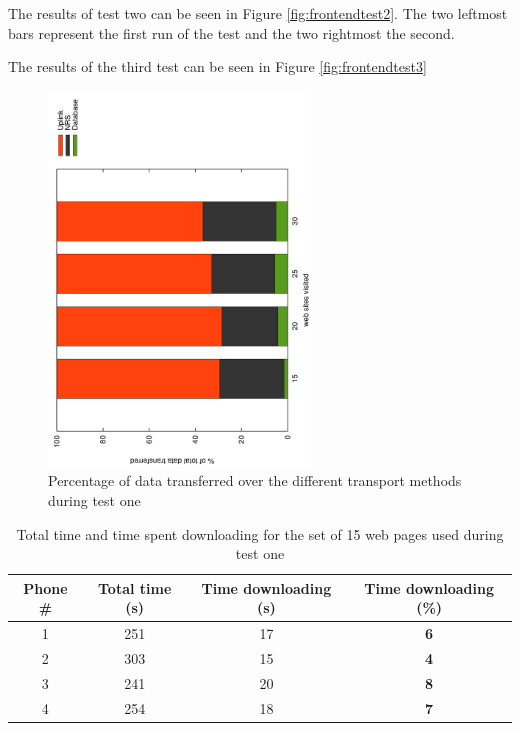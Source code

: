 The results of test two can be seen in Figure \ref{fig:frontendtest2}. The two leftmost bars represent 
the first run of the test and the two rightmost the second.

The results of the third test can be seen in Figure \ref{fig:frontendtest3}


\begin{figure}[H]
	\centering
		\includegraphics[width=0.62\textwidth, angle=-90]{./img/overall.pdf}
    	\caption{Percentage of data transferred over the different transport methods during test one}
	\label{fig:frontendtest1}
\end{figure}


\begin{table}[H]
		\centering
       \begin{tabular}{| c | c | c | c |}
               \hline
               Phone \# & Total time (s) & Time downloading (s) & Time downloading (\%)\\
               \hline
               1 & 251 & 17 & \textbf{6}\\
               \hline
               2 & 303 & 15 & \textbf{4}\\
               \hline
               3 & 241 & 20 & \textbf{8}\\
               \hline
               4 & 254 & 18 & \textbf{7}\\
               \hline
       \end{tabular}
       \caption{Total time and time spent downloading for the set of 15 web pages used during test one}
       \label{tbl:times}
\end{table}


